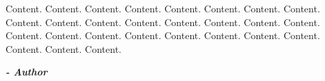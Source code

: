 
\begin{fquote}
\begin{center}
\large{

Content. Content. Content. Content. Content. Content. Content. Content. Content. Content. Content. Content. Content. Content. Content. Content. Content. Content. Content. Content. Content. Content. Content. Content. Content. Content. Content. 

}
\end{center}
\bigskip
\medskip
\end{fquote}

\begin{adjustwidth}{4cm}{1cm}
\hspace*{\fill} \textbf{\textit{\large{- Author}}}
\end{adjustwidth}

\clearpage